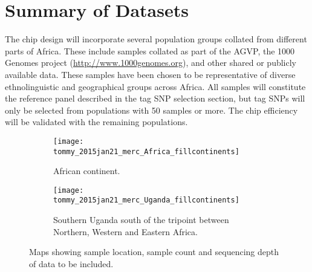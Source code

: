 \section{Summary of Datasets}
The chip design will incorporate several population groups collated from different parts of Africa. These include samples collated as part of the AGVP\cite{Gurdasani2014}, the 1000 Genomes project (\href{http://www.1000genomes.org}{http://www.1000genomes.org}),
 and other shared or publicly available data. These samples have been chosen to be representative of diverse ethnolinguistic and geographical groups across Africa. All samples will constitute the reference panel described in the tag SNP selection section, but tag SNPs will only be selected from populations with 50 samples or more. The chip efficiency will be validated with the remaining populations.

\begin{figure}[h]
\begin{subfigure}{.5\textwidth}
  \centering
  \texttt{[image: tommy\_2015jan21\_merc\_Africa\_fillcontinents]}
  \caption{African continent.}
\end{subfigure}%
\begin{subfigure}{.5\textwidth}
  \centering
  \texttt{[image: tommy\_2015jan21\_merc\_Uganda\_fillcontinents]}
  \caption{Southern Uganda south of the tripoint between Northern, Western and Eastern Africa.}
\end{subfigure}%
\caption{Maps showing sample location, sample count and sequencing depth of data to be included.}
\end{figure}

